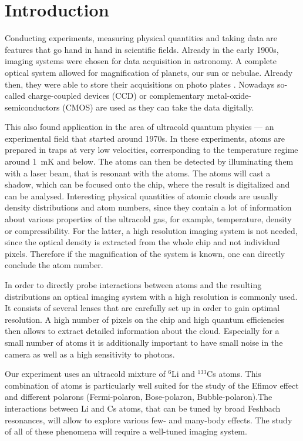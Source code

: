 \chapter{Introduction}
Conducting experiments, measuring physical quantities and taking data are features that go hand in hand in scientific fields. Already in the early 1900s, imaging systems were chosen for data acquisition in astronomy. A complete optical system allowed for magnification of planets, our sun or nebulae. Already then, they were able to store their acquisitions on photo plates \cite{hdaplates}. Nowadays so-called charge-coupled devices (CCD) or complementary metal-oxide-semiconductors (CMOS) are used as they can take the data digitally.

This also found application in the area of ultracold quantum physics --- an experimental field that started around 1970s. In these experiments, atoms are prepared in traps at very low velocities, corresponding to the temperature regime around \SI{1}{\milli\kelvin} and below. The atoms can then be detected by illuminating them with a laser beam, that is resonant with the atoms. The atoms will cast a shadow, which can be focused onto the chip, where the result is digitalized and can be analysed. Interesting physical quantities of atomic clouds are usually density distributions and atom numbers, since they contain a lot of information about various properties of the ultracold gas, for example, temperature, density or compressibility. For the latter, a high resolution imaging system is not needed, since the optical density is extracted from the whole chip and not individual pixels. Therefore if the magnification of the system is known, one can directly conclude the atom number.

In order to directly probe interactions between atoms and the resulting distributions an optical imaging system with a high resolution is commonly used. It consists of several lenses that are carefully set up in order to gain optimal resolution. A high number of pixels on the chip and high quantum efficiencies then allows to extract detailed information about the cloud. Especially for a small number of atoms it is additionally important to have small noise in the camera as well as a high sensitivity to photons.

Our experiment uses an ultracold mixture of $^6$Li and $^{133}$Cs atoms. This combination of atoms is particularly well suited for the study of the Efimov effect \cite{Pires2014,Ulmanis2015,Ulmanis2016} and different polarons\cite{Maier2012} (Fermi-polaron, Bose-polaron, Bubble-polaron).The interactions between Li and Cs atoms, that can be tuned by broad Feshbach resonances, will allow to explore various few- and many-body effects. The study of all of these phenomena will require a well-tuned imaging system.

